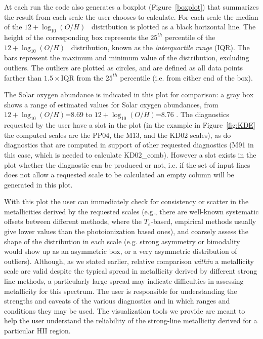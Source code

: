 \documentclass{emulateapj}
\newcommand{\oxabinline}{\ensuremath{12 + \log_{10}(O/H)}}
\begin{document}
At each run the code also generates a boxplot (Figure~\ref{boxplot}) that summarizes the result from each scale the user chooses to calculate. For each scale the median of the \oxabinline~ distribution is plotted as a black horizontal line. The height of the corresponding box represents the $25^{th}$ percentile of the \oxabinline~ distribution, known as the \emph{interquartile range} (IQR). 
The bars represent the maximum and minimum value of the distribution, excluding outliers. The outliers are plotted as circles, and are defined as all data points farther than $1.5\times\mathrm{IQR}$ from the $25^{th}$ percentile (i.e. from either end of the box). 

The Solar oxygen abundance is indicated in this plot for comparison: a gray box shows a range of estimated values for Solar oxygen abundances, from \oxabinline=8.69 \citep{asplund09_rev} to \oxabinline=8.76 \citep{chaffau11}.
The diagnostics requested by the user have a slot in the plot (in the example in Figure~\ref{fig:KDE} the computed scales are  the PP04, the M13, and the KD02 scales), as do diagnostics that are computed in support of other requested diagnostics (M91 in this case, which is needed to calculate KD02\_comb). However a slot exists in the plot whether the diagnostic can be produced or not, i.e. if the set of input lines does not allow a requested scale to be calculated an empty column will be generated in this plot. 

With this plot the user can immediately check for consistency or scatter in the metallicities derived by the requested scales (e.g., there are well-known systematic offsets between different methods, where the $T_e$-based, empirical methods usually give lower values than the photoionization based ones), and coarsely assess the shape of the distribution in each scale (e.g. strong asymmetry or bimodality would show up as an asymmetric box, or a very asymmetric distribution of outliers). Although, as we stated earlier, relative comparison \emph{within} a metallicity scale are valid despite the typical spread in metallicity derived by different strong line methods, a particularly large spread may indicate difficulties in assessing metallicity for this spectrum. The user is responsible for understanding the strengths and caveats of the various diagnostics and in which ranges and conditions they may be used. The visualization tools we provide are meant to help the user understand the reliability of the strong-line metallicity derived for a particular HII region. 
\end{document}
